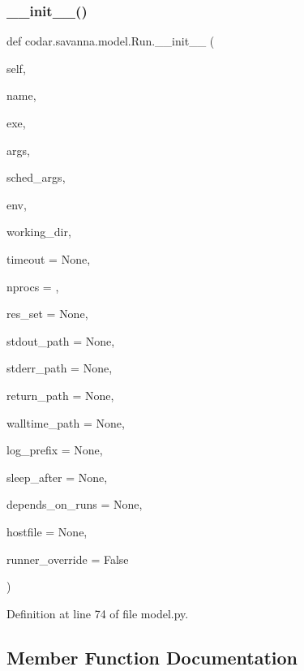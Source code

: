 \subsubsection{\texorpdfstring{\+\_\+\+\_\+init\+\_\+\+\_\+()}{\_\_init\_\_()}}
{\footnotesize\ttfamily def codar.\+savanna.\+model.\+Run.\+\_\+\+\_\+init\+\_\+\+\_\+ (\begin{DoxyParamCaption}\item[{}]{self,  }\item[{}]{name,  }\item[{}]{exe,  }\item[{}]{args,  }\item[{}]{sched\+\_\+args,  }\item[{}]{env,  }\item[{}]{working\+\_\+dir,  }\item[{}]{timeout = {\ttfamily None},  }\item[{}]{nprocs = {},  }\item[{}]{res\+\_\+set = {\ttfamily None},  }\item[{}]{stdout\+\_\+path = {\ttfamily None},  }\item[{}]{stderr\+\_\+path = {\ttfamily None},  }\item[{}]{return\+\_\+path = {\ttfamily None},  }\item[{}]{walltime\+\_\+path = {\ttfamily None},  }\item[{}]{log\+\_\+prefix = {\ttfamily None},  }\item[{}]{sleep\+\_\+after = {\ttfamily None},  }\item[{}]{depends\+\_\+on\+\_\+runs = {\ttfamily None},  }\item[{}]{hostfile = {\ttfamily None},  }\item[{}]{runner\+\_\+override = {\ttfamily False} }\end{DoxyParamCaption})}



Definition at line 74 of file model.\+py.



\subsection{Member Function Documentation}
\mbox{\label{classcodar_1_1savanna_1_1model_1_1_run_a73899dead2dbe21ee0242edf9e21515d}} 

